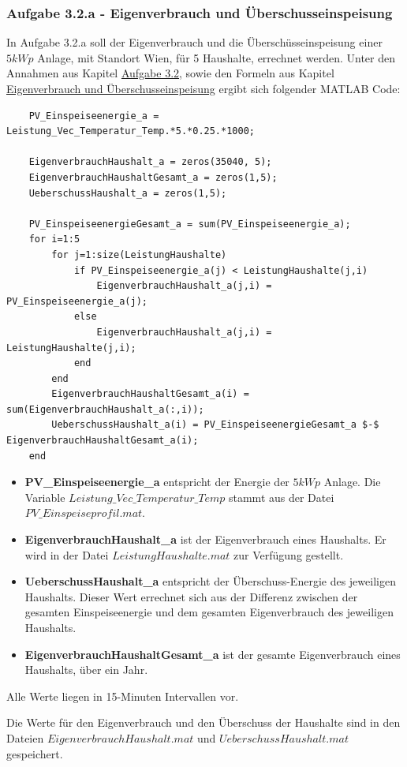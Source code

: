 \documentclass[a4paper,12pt]{article}
\begin{document}
	\subsubsection{Aufgabe 3.2.a - Eigenverbrauch und Überschusseinspeisung}
	In Aufgabe 3.2.a soll der Eigenverbrauch und die Überschüsseinspeisung einer $5kWp$ Anlage, mit Standort Wien, für 5 Haushalte, errechnet werden.\newline
	Unter den Annahmen aus Kapitel \hyperref[sec:Aufgabenstellung32]{Aufgabe 3.2}, sowie den Formeln aus Kapitel \hyperref[sec:eigenverbrauchueberschusseinspeisung]{Eigenverbrauch und Überschusseinspeisung} ergibt sich folgender MATLAB Code:
	\begin{lstlisting}
	PV_Einspeiseenergie_a = Leistung_Vec_Temperatur_Temp.*5.*0.25.*1000;
	
	EigenverbrauchHaushalt_a = zeros(35040, 5);
	EigenverbrauchHaushaltGesamt_a = zeros(1,5);
	UeberschussHaushalt_a = zeros(1,5);
	
	PV_EinspeiseenergieGesamt_a = sum(PV_Einspeiseenergie_a);
	for i=1:5
		for j=1:size(LeistungHaushalte)
			if PV_Einspeiseenergie_a(j) < LeistungHaushalte(j,i)
				EigenverbrauchHaushalt_a(j,i) = PV_Einspeiseenergie_a(j);
			else
				EigenverbrauchHaushalt_a(j,i) = LeistungHaushalte(j,i);
			end
		end
		EigenverbrauchHaushaltGesamt_a(i) = sum(EigenverbrauchHaushalt_a(:,i));
		UeberschussHaushalt_a(i) = PV_EinspeiseenergieGesamt_a $-$ EigenverbrauchHaushaltGesamt_a(i);
	end
	\end{lstlisting}
	\begin{itemize}
		\item \textbf{PV\_Einspeiseenergie\_a} entspricht der Energie der $5kWp$ Anlage. Die Variable $Leistung\_Vec\_Temperatur\_Temp$ stammt aus der Datei $PV\_Einspeiseprofil.mat$.
		\item \textbf{EigenverbrauchHaushalt\_a} ist der Eigenverbrauch eines Haushalts. Er wird in der Datei $LeistungHaushalte.mat$ zur Verfügung gestellt.
		\item \textbf{UeberschussHaushalt\_a} entspricht der Überschuss-Energie des jeweiligen Haushalts. Dieser Wert errechnet sich aus der Differenz zwischen der gesamten Einspeiseenergie und dem gesamten Eigenverbrauch des jeweiligen Haushalts.
		\item \textbf{EigenverbrauchHaushaltGesamt\_a} ist der gesamte Eigenverbrauch eines Haushalts, über ein Jahr.
	\end{itemize}
	Alle Werte liegen in 15-Minuten Intervallen vor.\\ \par
	\noindent Die Werte für den Eigenverbrauch und den Überschuss der Haushalte sind in den Dateien $EigenverbrauchHaushalt.mat$ und $UeberschussHaushalt.mat$ gespeichert.
\end{document}
